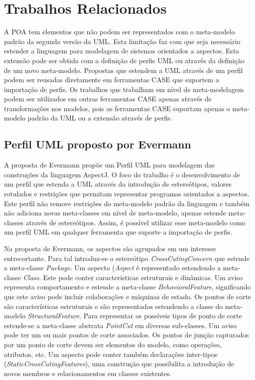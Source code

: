 \chapter{Trabalhos Relacionados}
\label{sec:trabalhos_relacionados}

A POA tem elementos que não podem ser representados com o meta-modelo padrão da segunda versão da UML. Esta limitação faz com que seja necessário
estender a linguagem para modelagem de sistemas orientados a aspectos. Esta extensão pode ser obtida com a definição de perfis UML ou através da
definição de um novo meta-modelo. Propostas que estendem a UML através de um perfil podem ser reusadas diretamente em ferramentas CASE que suportem a
importação de perfis. Os trabalhos que trabalham em nível de meta-modelagem podem ser utilizados em outras ferramentas CASE apenas através de
transformações nos modelos, pois as ferramentas CASE suportam apenas o meta-modelo padrão da UML ou a extensão através de perfis. 

\section{Perfil UML proposto por Evermann}


A proposta de Evermann \cite{Evermann:2007:MSP:1229375.1229379} propõe um Perfil UML para modelagem das construções da linguagem AspectJ. O foco do
trabalho é o desenvolvimento de um perfil que estenda a UML através da introdução de estereótipos, valores rotulados e restrições que permitam representar 
programas orientados a aspectos. Este perfil não remove restrições do meta-modelo padrão da linguagem e também não adiciona novas meta-classes em nível de
meta-modelo, apenas estende meta-classes através de estereótipos. Assim, é possível utilizar esse meta-modelo como um perfil UML em qualquer ferramenta que 
suporte a importação de perfis.

Na proposta de Evermann, os aspectos são agrupados em um interesse entrecortante. Para tal introduz-se o estereótipo \textit{CrossCutingConcern} que
estende a meta-classe \textit{Package}. Um aspecto (\textit{Aspect} é representado estendendo a meta-classe \textit{Class}. Este pode conter características
estruturais e dinâmicas. Um aviso representa comportamento e estende a meta-classe \textit{BehavioralFeature}, significando que este aviso pode
incluir colaborações e máquinas de estado. Os pontos de corte são características estruturais e são representados estendendo a classe do meta-modelo
\textit{StructuralFeature}. Para representar os possíveis tipos de ponto de corte estende-se a meta-classe abstrata \textit{PointCut} em diversas
sub-classes. Um aviso pode ter um ou mais pontos de corte associados. Os pontos de junção capturados por um ponto de corte devem ser elementos do
modelo, como operações, atributos, etc. Um aspecto pode conter também declarações inter-tipos (\textit{StaticCrossCutingFeatures}), uma construção que
possibilita a introdução de novos membros e relacionamentos em classes existentes. 

